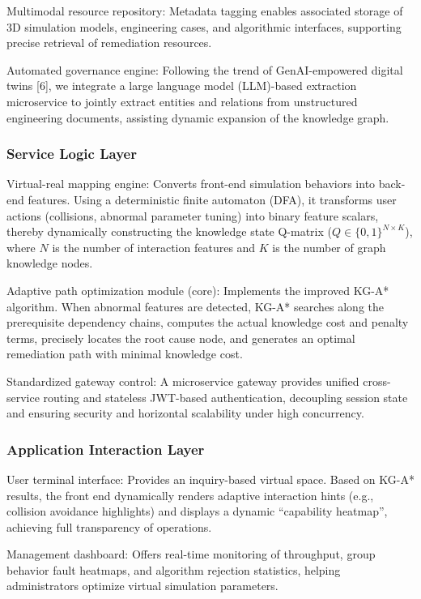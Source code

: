 \documentclass{ieeeaccess}
\begin{document}
Multimodal resource repository: Metadata tagging enables associated storage of 3D simulation models, engineering cases, and algorithmic interfaces, supporting precise retrieval of remediation resources.

Automated governance engine: Following the trend of GenAI-empowered digital twins [6], we integrate a large language model (LLM)-based extraction microservice to jointly extract entities and relations from unstructured engineering documents, assisting dynamic expansion of the knowledge graph.

\subsubsection{Service Logic Layer}
Virtual-real mapping engine: Converts front-end simulation behaviors into back-end features. Using a deterministic finite automaton (DFA), it transforms user actions (collisions, abnormal parameter tuning) into binary feature scalars, thereby dynamically constructing the knowledge state Q-matrix ($Q \in \{0,1\}^{N \times K}$), where $N$ is the number of interaction features and $K$ is the number of graph knowledge nodes.

Adaptive path optimization module (core): Implements the improved KG-A* algorithm. When abnormal features are detected, KG-A* searches along the prerequisite dependency chains, computes the actual knowledge cost and penalty terms, precisely locates the root cause node, and generates an optimal remediation path with minimal knowledge cost.

Standardized gateway control: A microservice gateway provides unified cross-service routing and stateless JWT-based authentication, decoupling session state and ensuring security and horizontal scalability under high concurrency.

\subsubsection{Application Interaction Layer}
User terminal interface: Provides an inquiry-based virtual space. Based on KG-A* results, the front end dynamically renders adaptive interaction hints (e.g., collision avoidance highlights) and displays a dynamic ``capability heatmap'', achieving full transparency of operations.

Management dashboard: Offers real-time monitoring of throughput, group behavior fault heatmaps, and algorithm rejection statistics, helping administrators optimize virtual simulation parameters.
\end{document}
